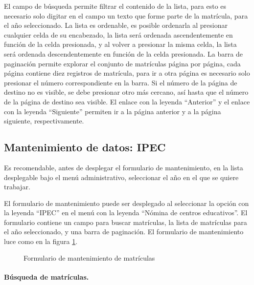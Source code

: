 \documentclass[a4paper, 9pt, conference]{article}              %
\begin{document}
El campo de b\'usqueda permite filtrar el contenido de la lista, para esto es necesario solo digitar en el campo un texto que forme parte de la matr\'icula, para el a\~no seleccionado. La lista es ordenable, es posible ordenarla al presionar cualquier celda de su encabezado, la lista ser\'a ordenada ascendentemente en funci\'on de la celda presionada, y al volver a presionar la misma celda, la lista ser\'a ordenada descendentemente en funci\'on de la celda presionada. La barra de paginaci\'on permite explorar el conjunto de matr\'iculas p\'agina por p\'agina, cada p\'agina contiene diez registros de matr\'icula, para ir a otra p\'agina es necesario solo presionar el n\'umero correspondiente en la barra. Si el n\'umero de la p\'agina de destino no es visible, se debe presionar otro m\'as cercano, as\'i hasta que el n\'umero de la p\'agina de destino sea visible. El enlace con la leyenda ``Anterior'' y el enlace con la leyenda ``Siguiente'' permiten ir a la p\'agina anterior y a la p\'agina siguiente, respectivamente.


\subsection{Mantenimiento de datos: IPEC}
Es recomendable, antes de desplegar el formulario de mantenimiento, en la lista desplegable bajo el men\'u administrativo, seleccionar el a\~no en el que se quiere trabajar.

El formulario de mantenimiento puede ser desplegado al seleccionar la opci\'on con la leyenda ``IPEC'' en el men\'u con la leyenda ``N\'omina de centros educativos''. El formulario contiene un campo para buscar matr\'iculas, la lista de matr\'iculas para el a\~no seleccionado, y una barra de paginaci\'on. El formulario de mantenimiento luce como en la figura \ref{fig:geoenrollments8}.

\begin{figure}
	\centering
		\caption{Formulario de mantenimiento de matr\'iculas}
	\label{fig:geoenrollments8}
\end{figure}


\paragraph{B\'usqueda de matr\'iculas.}
\end{document}

